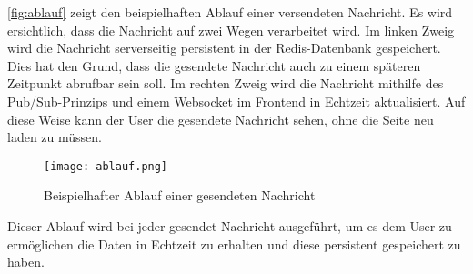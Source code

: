 \autoref{fig:ablauf} zeigt den beispielhaften Ablauf einer versendeten Nachricht. Es wird ersichtlich, dass die Nachricht auf zwei Wegen verarbeitet wird. Im linken Zweig wird die Nachricht serverseitig persistent in der \acs{Redis}-Datenbank gespeichert. Dies hat den Grund, dass die gesendete Nachricht auch zu einem späteren Zeitpunkt abrufbar sein soll. Im rechten Zweig wird die Nachricht mithilfe des \acs{Pub/Sub}-Prinzips und einem Websocket im Frontend in Echtzeit aktualisiert. Auf diese Weise kann der User die gesendete Nachricht sehen, ohne die Seite neu laden zu müssen.

\begin{figure}[h]
	\centering
	\texttt{[image: ablauf.png]}
	\caption{Beispielhafter Ablauf einer gesendeten Nachricht}
	\label{fig:ablauf}
\end{figure}

Dieser Ablauf wird bei jeder gesendet Nachricht ausgeführt, um es dem User zu ermöglichen die Daten in Echtzeit zu erhalten und diese persistent gespeichert zu haben.
